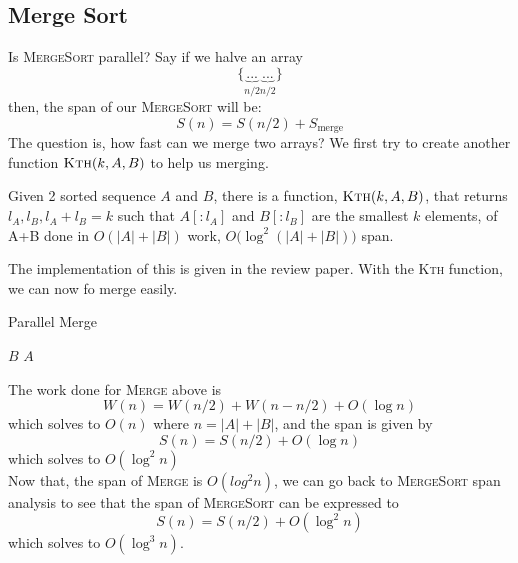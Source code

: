 \documentclass[12pt]{article}
\begin{document}
\subsection{Merge Sort}
Is \textsc{MergeSort} parallel? 
Say if we halve an array
$$\{\underbrace{...}_{n/2}\underbrace{...}_{n/2}\}$$
then, the span of our \textsc{MergeSort} will be:
$$S(n) = S(n/2) + S_{\text{merge}}$$
The question is, how fast can we merge two arrays? We first try to create another function $\textsc{Kth}(k,A,B)$ to help us merging.
\begin{claim}
	Given 2 sorted sequence $A$ and $B$, there is a function, $\textsc{Kth}(k,A,B)$, that returns $l_A,l_B, l_A +l_B = k$ such that $A[:l_A]$ and $B[:l_B]$ are the smallest $k$ elements, of A+B done in $O(|A|+|B|)$ work, $O(\log^2{(|A|+|B|))} $ span.
\end{claim}
The implementation of this is given in the review paper. With the \textsc{Kth} function, we can now fo merge easily.
\begin{algorithm}[H]
	\caption{Parallel Merge}
	\begin{algorithmic}[1]
		\State \Return $B$
		\EndIf
		\State \Return $A$
		\EndIf
		\State {}
		\EndFunction
	\end{algorithmic}
\end{algorithm}

The work done for \textsc{Merge} above is $$W(n) = W(n/2) + W(n-n/2) + O(\log{n})$$
which solves to $O(n)$ where $n = |A| + |B|$, and the span is given by
$$S(n) = S(n/2) + O(\log{n})$$
which solves to $O(\log^2n)$\\

Now that, the span of \textsc{Merge} is $O(log^2n)$, we can go back to \textsc{MergeSort} span analysis to see that the span of \textsc{MergeSort} can be expressed to 
$$S(n) = S(n/2) + O(\log^2n)$$
which solves to $O(\log^3n)$.
\end{document}
